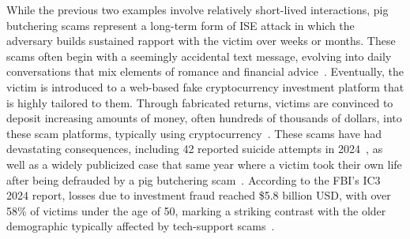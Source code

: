 
 While the previous two examples involve relatively short-lived interactions, pig butchering scams represent a long-term form of ISE attack in which the adversary builds sustained rapport with the victim over weeks or months. These scams often begin with a seemingly accidental text message, evolving into daily conversations that mix elements of romance and financial advice~\cite{xie2025did,oak2025hello,han2025anatomy}. Eventually, the victim is introduced to a web-based fake cryptocurrency investment platform that is highly tailored to them. Through fabricated returns, victims are convinced to deposit increasing amounts of money, often hundreds of thousands of dollars, into these scam platforms, typically using cryptocurrency~\cite{irs_psa_pig_butchering,xie2025did,oak2025hello}. These scams have had devastating consequences, including 42 reported suicide attempts in 2024~\cite{ic3_report_24}, as well as a widely publicized case that same year where a victim took their own life after being defrauded by a pig butchering scam~\cite{pig_butchering_suicide_report}. According to the FBI's IC3 2024 report, losses due to investment fraud reached \$5.8 billion USD, with over 58\% of victims under the age of 50, marking a striking contrast with the older demographic typically affected by tech-support scams~\cite{ic3_report_24}.


